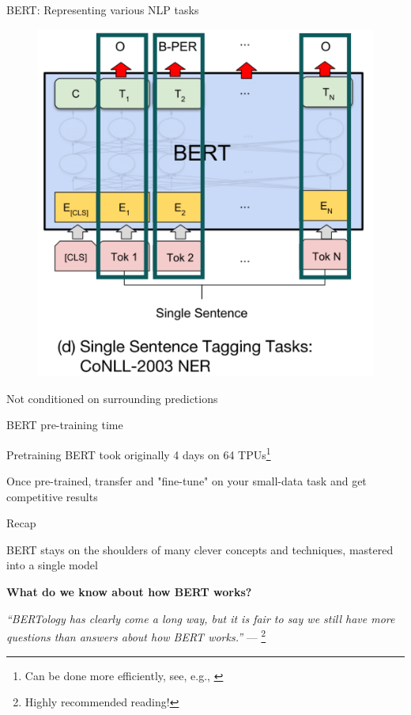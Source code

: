 \documentclass[12pt,aspectratio=169,handout]{beamer}
\begin{document}
\begin{frame}{BERT: Representing various NLP tasks}
	
	\begin{figure}
		\includegraphics[width=0.5\linewidth]{img/task3.png}
	\end{figure}
	
	
	Not conditioned on surrounding predictions	
	
\end{frame}



\begin{frame}{BERT pre-training time}
		
	Pretraining BERT took originally 4 days on 64 TPUs\footnote{Can be done more efficiently, see, e.g., \citet{izsak-etal-2021-train}}
	
	\bigskip
	
	Once pre-trained, transfer and "fine-tune" on your small-data task and get competitive results


	

	
\end{frame}


\begin{frame}{Recap}
	
	BERT stays on the shoulders of many clever concepts and techniques, mastered into a single model
	
\textbf{What do we know about how BERT works?}

	
\emph{``BERTology has clearly come a long way, but it is fair to say we still have more questions than answers about how BERT works.''} --- \citet{Rogers.et.al.2020.BERT}\footnote{Highly recommended reading!}
	
	
	
\end{frame}
\end{document}
